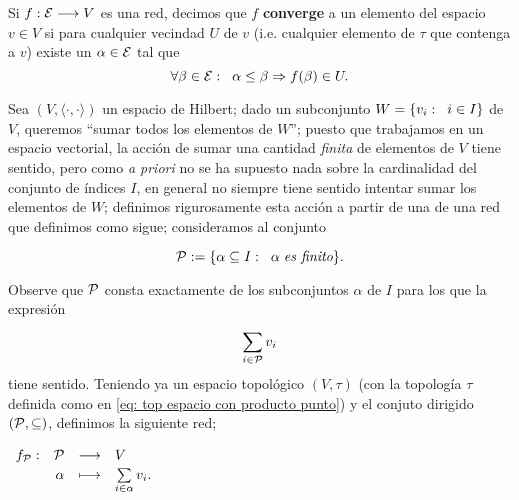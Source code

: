 \begin{defi}
\label{def: net que converge}
Si $f: \mathcal{E} \longrightarrow V$ es una red, decimos que $f$ 
\textbf{converge} a un elemento del espacio $v \in V$ si 
para cualquier vecindad $U$ de $v$ (i.e. cualquier elemento
de $\tau$ que contenga a $v$) existe un $\alpha \in \mathcal{E}$ tal que
\[
\forall \beta \in \mathcal{E}: \hspace{0.2cm} 
\alpha \leq \beta \Rightarrow f(\beta) \in U.
\]
\end{defi}



Sea $(V, \langle \cdot , \cdot\rangle)$ un espacio de Hilbert;
dado un subconjunto $W = \{ v_{i} : \hspace{0.2cm} i \in I \}$
de $V$, queremos ``sumar todos los elementos de 
$W$''; puesto que trabajamos en un espacio vectorial,
la acción de sumar una cantidad \textit{finita} de elementos
de $V$ tiene sentido, pero como
\textit{a priori} no se ha supuesto nada
sobre la cardinalidad del conjunto de índices $I$, 
en general no siempre tiene sentido intentar sumar los elementos de $W$;
definimos rigurosamente esta acción a partir de una
de una red que definimos como sigue; consideramos al conjunto


\begin{comment}
{
\Huge{$\alpha$}

\Huge{$\beta$}\\

\Huge{$\gamma$}
}
\end{comment}

\begin{equation}
\label{eq0: 14ap}
\mathcal{P} := \{ \alpha \subseteq I : \hspace{0.2cm} \alpha \hspace{0.1cm} \textit{es finito} \}.
\end{equation}

\noindent 
Observe que $\mathcal{P}$ consta exactamente de los subconjuntos $\alpha$
de $I$ para los que la expresión 
\[
\sum\limits_{i \in \mathcal{P}}^{}v_{i}
\]
tiene sentido. Teniendo ya un espacio topológico $(V, \tau)$
(con la topología $\tau$ definida como en
\eqref{eq: top espacio con producto punto})
y el conjuto dirigido $(\mathcal{P}, \subseteq)$,
definimos la siguiente red;

\begin{center}
\label{eq: net a partir de un subconjunto de un espacio de Hilbert}
$\text{${\begin{array}{crcl} f_{\mathcal{P}}: & \mathcal{P} & \longrightarrow & V \\ \, & \alpha & \longmapsto &  \sum\limits_{i \in \alpha}^{}v_{i}. \end{array}}$}$
\end{center}

